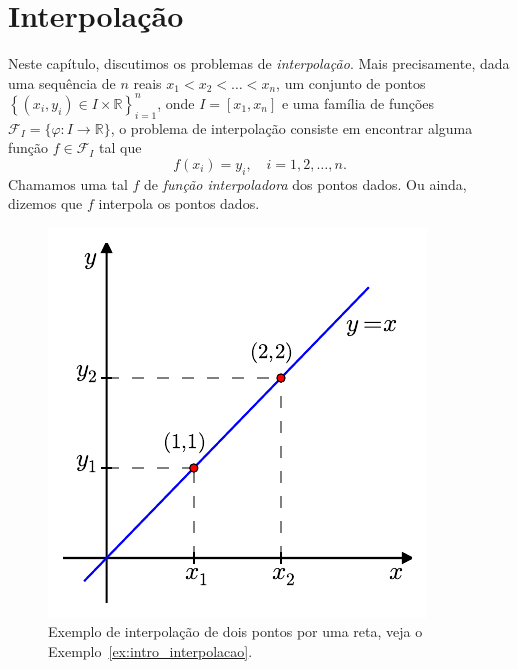 
%

\chapter{Interpolação}\label{cap_interpola}

Neste capítulo, discutimos os problemas de \emph{interpolação}. Mais precisamente, dada uma sequência de $n$ reais $x_1<x_2<\ldots<x_n$, um conjunto de pontos $\left\{(x_i, y_i)\in I\times\mathbb{R}\right\}_{i=1}^n$, onde $I=\left[x_1,x_n\right]$ e uma família de funções $\mathcal{F}_I = \{\varphi:I\rightarrow\mathbb{R}\}$, o problema de interpolação consiste em encontrar alguma função $f\in\mathcal{F}_I$ tal que
\begin{equation*}
  f(x_i) = y_i,\quad i=1, 2, \dotsc, n.
\end{equation*}
Chamamos uma tal $f$ de \emph{função interpoladora} dos pontos dados. Ou ainda, dizemos que $f$ interpola os pontos dados.

\begin{figure}
  \centering
  \includegraphics[scale=0.9]{./cap_interp/pics/ex_intro_interpolacao/ex_intro_interpolacao}
  \caption{Exemplo de interpolação de dois pontos por uma reta, veja o Exemplo~\ref{ex:intro_interpolacao}.}\label{fig:ex_intro_interp}
\end{figure}

